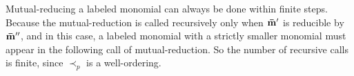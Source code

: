 \documentclass[final, number, 3p,12pt]{elsarticle}
\newtheorem{cor}[theorem]{Corollary}
\def\B{{\mathbb{B}}}
\def\brm{{\bf \bar{m}}}
\begin{document}
Mutual-reducing a labeled monomial can always be done within finite steps. Because the mutual-reduction is called recursively only when $\brm'$ is reducible by $\brm''$, and in this case, a labeled monomial with a strictly smaller monomial must appear in the following call of mutual-reduction. So the number of recursive calls is finite, since $\prec_p$ is a well-ordering.



%
%


%
%
%
%
%
%
%
\end{document}
